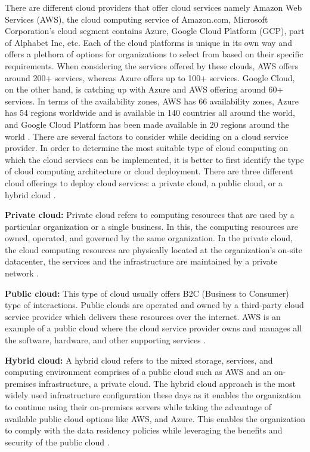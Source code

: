 \par There are different cloud providers that offer cloud services namely Amazon Web Services (AWS), the cloud computing service of Amazon.com, Microsoft Corporation’s cloud segment contains Azure, Google Cloud Platform (GCP), part of Alphabet Inc, etc. Each of the cloud platforms is unique in its own way and offers a plethora of options for organizations to select from based on their specific requirements. When considering the services offered by these clouds, AWS offers around 200+ services, whereas Azure offers up to 100+ services. Google Cloud, on the other hand, is catching up with Azure and AWS offering around 60+ services. In terms of the availability zones, AWS has 66 availability zones, Azure has 54 regions worldwide and is available in 140 countries all around the world, and Google Cloud Platform has been made available in 20 regions around the world \cite{13}. There are several factors to consider while deciding on a cloud service provider. In order to determine the most suitable type of cloud computing on which the cloud services can be implemented, it is better to first identify the type of cloud computing architecture or cloud deployment. There are three different cloud offerings to deploy cloud services: a private cloud, a public cloud, or a hybrid cloud \cite{14}.

\textbf{Private cloud:}
Private cloud refers to computing resources that are used by a particular organization or a single business.
In this,
the computing resources are owned, operated, and governed by the same organization.
In the private cloud, the cloud
computing resources are physically located at the organization’s on-site datacenter, the services and the
infrastructure are maintained by a private network \cite{14}.

\textbf{Public cloud:}
This type of cloud usually offers B2C (Business to Consumer) type of interactions. Public clouds are operated and
owned by a third-party cloud service provider which delivers these resources over the internet. AWS is an example of
a public cloud where the cloud service provider owns and manages all the software, hardware, and other supporting
services \cite{14}.

\textbf{Hybrid cloud:}
A hybrid cloud refers to the mixed storage, services, and computing environment comprises of a public cloud such as
AWS and an on-premises infrastructure, a private cloud. The hybrid cloud approach is the most widely used infrastructure configuration these days as it enables the organization
to continue using their on-premises servers while taking the advantage of available public cloud options like AWS,
and Azure. This enables the organization to comply with the data residency policies while leveraging the benefits and
security of the public cloud \cite{14}.


